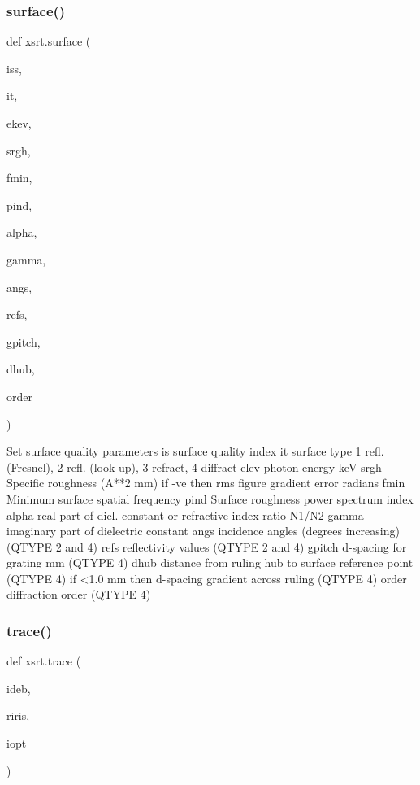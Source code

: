 \subsubsection{\texorpdfstring{surface()}{surface()}}
{\footnotesize\ttfamily def xsrt.\+surface (\begin{DoxyParamCaption}\item[{}]{iss,  }\item[{}]{it,  }\item[{}]{ekev,  }\item[{}]{srgh,  }\item[{}]{fmin,  }\item[{}]{pind,  }\item[{}]{alpha,  }\item[{}]{gamma,  }\item[{}]{angs,  }\item[{}]{refs,  }\item[{}]{gpitch,  }\item[{}]{dhub,  }\item[{}]{order }\end{DoxyParamCaption})}

\begin{DoxyVerb}Set surface quality parameters
    is      surface quality index
    it      surface type
            1 refl. (Fresnel), 2 refl. (look-up), 3 refract, 4 diffract
    elev    photon energy keV
    srgh    Specific roughness (A**2 mm)
            if -ve then rms figure gradient error radians
    fmin    Minimum surface spatial frequency
    pind    Surface roughness power spectrum index
    alpha   real part of diel. constant or refractive index ratio N1/N2
    gamma   imaginary part of dielectric constant
    angs    incidence angles (degrees increasing) (QTYPE 2 and 4)
    refs    reflectivity values (QTYPE 2 and 4)
    gpitch  d-spacing for grating mm (QTYPE 4)
    dhub    distance from ruling hub to surface reference point (QTYPE 4)
            if <1.0 mm then d-spacing gradient across ruling (QTYPE 4)
    order   diffraction order (QTYPE 4)
\end{DoxyVerb}
 \mbox{\label{namespacexsrt_aeb72e4fb8385e5fe604f329b05c32b93}} 
\subsubsection{\texorpdfstring{trace()}{trace()}}
{\footnotesize\ttfamily def xsrt.\+trace (\begin{DoxyParamCaption}\item[{}]{ideb,  }\item[{}]{riris,  }\item[{}]{iopt }\end{DoxyParamCaption})}

